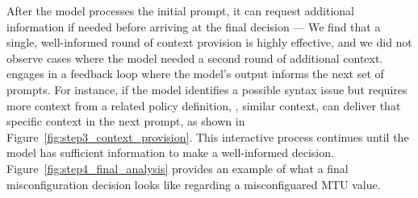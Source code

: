  After the model processes the initial prompt, it can request additional information if needed before arriving at the final decision --- We find that a single, well-informed round of context provision is highly effective, and we did not observe cases where the model needed a second round of additional context. \sysname{} engages in a feedback loop where the model’s output informs the next set of prompts. For instance, if the model identifies a possible syntax issue but requires more context from a related policy definition, \ie, similar context, \sysname{} can deliver that specific context in the next prompt, as shown in Figure~\ref{fig:step3_context_provision}. This interactive process continues until the model has sufficient information to make a well-informed decision. Figure~\ref{fig:step4_final_analysis} provides an example of what a final misconfiguration decision looks like regarding a misconfiguared MTU value.







